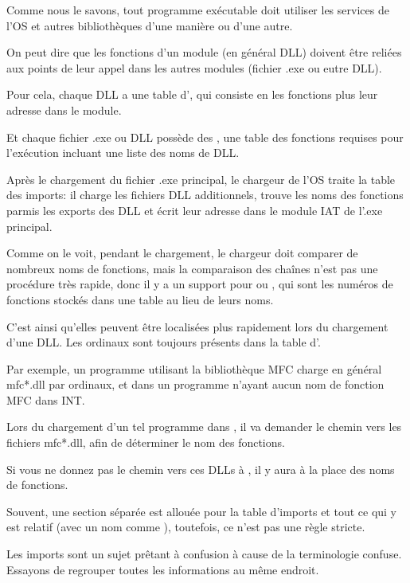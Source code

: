 \label{PE_exports_imports}
Comme nous le savons, tout programme exécutable doit utiliser les services de l'\ac{OS}
et autres bibliothèques d'une manière ou d'une autre.

On peut dire que les fonctions d'un module (en général DLL) doivent être reliées
aux points de leur appel dans les autres modules (fichier .exe ou eutre DLL).

Pour cela, chaque DLL a une table d', qui consiste en les fonctions plus
leur adresse dans le module.

Et chaque fichier .exe ou DLL possède des , une table des fonctions requises
pour l'exécution incluant une liste des noms de DLL.

Après le chargement du fichier .exe principal, le chargeur de l'\ac{OS} traite la
table des imports: il charge les fichiers DLL additionnels, trouve les noms des fonctions
parmis les exports des DLL et écrit leur adresse dans le module \ac{IAT} de l'.exe
principal.


Comme on le voit, pendant le chargement, le chargeur doit comparer de nombreux noms
de fonctions, mais la comparaison des chaînes n'est pas une procédure très rapide,
donc il y a un support pour  ou , qui sont les numéros de fonctions
stockés dans une table au lieu de leurs noms.

C'est ainsi qu'elles peuvent être localisées plus rapidement lors du chargement d'une
DLL. Les ordinaux sont toujours présents dans la table d'.

Par exemple, un programme utilisant la bibliothèque \ac{MFC} charge en général mfc*.dll
par ordinaux, et dans un programme n'ayant aucun nom de fonction \ac{MFC} dans \ac{INT}.

Lors du chargement d'un tel programme dans \IDA, il va demander le chemin vers les
fichiers mfc*.dll, afin de déterminer le nom des fonctions.

Si vous ne donnez pas le chemin vers ces DLLs à \IDA, il y aura  à
la place des noms de fonctions.


Souvent, une section séparée est allouée pour la table d'imports et tout ce qui y
est relatif (avec un nom comme ), toutefois, ce n'est pas une règle stricte.

Les imports sont un sujet prêtant à confusion à cause de la terminologie confuse.
Essayons de regrouper toutes les informations au même endroit.

